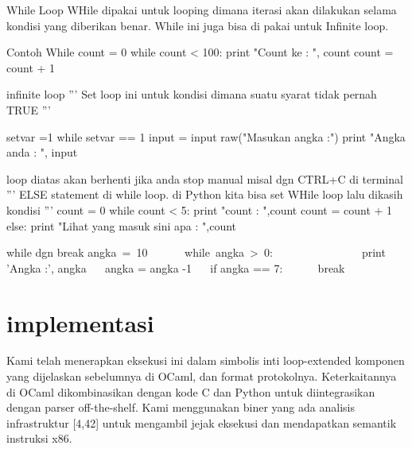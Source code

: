 While Loop 
WHile dipakai untuk looping dimana iterasi akan dilakukan selama kondisi yang diberikan benar. While ini juga bisa di pakai untuk Infinite loop. 

Contoh While 
count = 0 
while count < 100: 
           print "Count ke : ", count 
           count = count + 1 

infinite loop 
''' 
Set loop ini untuk kondisi dimana suatu syarat tidak pernah TRUE 
''' 

setvar =1 
while setvar == 1 
        input = input     raw("Masukan angka :") 
        print "Angka anda : ", input 

loop diatas akan berhenti jika anda stop manual misal dgn CTRL+C di terminal 
''' 
ELSE statement di while loop. di Python kita bisa set WHile loop lalu dikasih kondisi 
''' 
count = 0 
while count < 5: 
           print "count : ",count 
           count = count + 1 
else: 
        print "Lihat yang masuk sini apa : ",count 

while dgn break 
angka~=~10~~~~~~    
while~angka~>~0:~~~~~~~~~~     
~~  
~~ print 'Angka :', angka 
~~ angka = angka -1 
~~ if angka == 7: 
~~~~~ break 




\section {implementasi}
Kami telah menerapkan eksekusi ini dalam simbolis inti loop-extended komponen yang dijelaskan sebelumnya di OCaml, dan format protokolnya. 
Keterkaitannya di OCaml dikombinasikan dengan kode C dan Python untuk diintegrasikan dengan parser off-the-shelf. 
Kami menggunakan biner yang ada analisis infrastruktur [4,42] untuk mengambil jejak eksekusi dan mendapatkan semantik instruksi x86.
